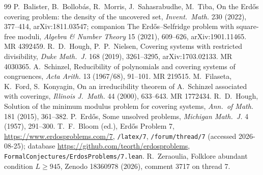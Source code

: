 \documentclass[11pt,a4paper]{article}
\theoremstyle{plain}
\theoremstyle{definition}
\theoremstyle{remark}
\begin{document}
\begin{thebibliography}{99}
 P.~Balister, B.~Bollob\'as, R.~Morris, J.~Sahasrabudhe, M.~Tiba, On the Erd\H{o}s covering problem: the density of the uncovered set, \textit{Invent.\ Math.} 230 (2022), 377--414, arXiv:1811.03547; companion The Erd\H{o}s--Selfridge problem with square-free moduli, \textit{Algebra \& Number Theory} 15 (2021), 609--626, arXiv:1901.11465. MR 4392459.
 R.~D.~Hough, P.~P.~Nielsen, Covering systems with restricted divisibility, \textit{Duke Math.\ J.} 168 (2019), 3261--3295, arXiv:1703.02133. MR 4030365.
 A.~Schinzel, Reducibility of polynomials and covering systems of congruences, \textit{Acta Arith.} 13 (1967/68), 91--101. MR 219515.
 M.~Filaseta, K.~Ford, S.~Konyagin, On an irreducibility theorem of A.\ Schinzel associated with coverings, \textit{Illinois J.\ Math.} 44 (2000), 633--643. MR 1772434.
 R.~D.~Hough, Solution of the minimum modulus problem for covering systems, \textit{Ann.\ of Math.} 181 (2015), 361--382.
 P.~Erd\H{o}s, Some unsolved problems, \textit{Michigan Math.\ J.} 4 (1957), 291--300.
 T.~F.~Bloom (ed.), Erd\H{o}s Problem 7, \url{https://www.erdosproblems.com/7}, \texttt{/latex/7}, \texttt{/forum/thread/7} (accessed 2026-08-25); database \url{https://github.com/teorth/erdosproblems}, \texttt{FormalConjectures/ErdosProblems/7.lean}.
 R.~Zeraoulia, Folklore abundant condition $L\ge945$, Zenodo 18360978 (2026), comment 3717 on thread 7.
\end{thebibliography}
\end{document}
